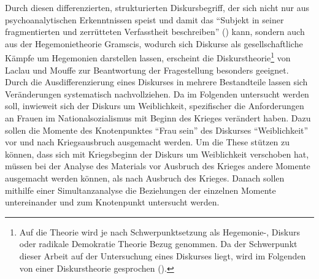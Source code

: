 \documentclass[12pt, titlepage=true, toc=bib]{scrartcl}
\begin{document}
{Durch diesen differenzierten, strukturierten Diskursbegriff, der sich nicht nur aus psychoanalytischen Erkenntnissen speist und damit das "`Subjekt in seiner fragmentierten und zerrütteten Verfasstheit beschreiben"' (\cite[198]{nonhoff_kollektive_2007}) kann, sondern auch aus der Hegemonietheorie Gramscis, wodurch sich Diskurse als gesellschaftliche Kämpfe um Hegemonien darstellen lassen, erscheint die Diskurstheorie\footnote{Auf die Theorie wird je nach Schwerpunktsetzung als Hegemonie-, Diskurs oder radikale Demokratie Theorie Bezug genommen. Da der Schwerpunkt dieser Arbeit auf der Untersuchung eines Diskurses liegt, wird im Folgenden von einer Diskurstheorie gesprochen (\cite[vgl.][]{nonhoff_diskurs_2007-1}).} von Laclau und Mouffe zur Beantwortung der Fragestellung besonders geeignet. Durch die Ausdifferenzierung eines Diskurses in mehrere Bestandteile lassen sich Veränderungen systematisch nachvollziehen. Da im Folgenden untersucht werden soll, inwieweit sich der Diskurs um Weiblichkeit, spezifischer die Anforderungen an Frauen im Nationalsozialismus mit Beginn des Krieges verändert haben. Dazu sollen die Momente des Knotenpunktes "`Frau sein"' des Diskurses "`Weiblichkeit"' vor und nach Kriegsausbruch ausgemacht werden. Um die These stützen zu können, dass sich mit Kriegsbeginn der Diskurs um Weiblichkeit verschoben hat, müssen bei der Analyse des Materials vor Ausbruch des Krieges andere Momente ausgemacht werden können, als nach Ausbruch des Krieges. Danach sollen mithilfe einer Simultanzanalyse die Beziehungen der einzelnen Momente untereinander und zum Knotenpunkt untersucht werden.


}
\end{document}

